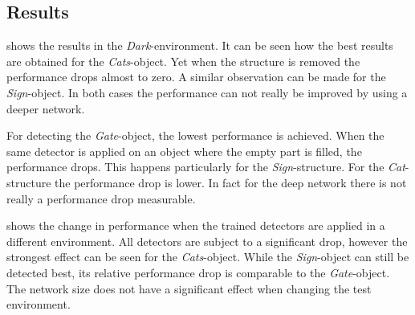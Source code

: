 \subsection{Results}

\begin{table}[hbtp]
	\centering
	
	\caption{Performance of two architectures when the test environment is similar to the training environment. Each trained network (row) is evaluated on each test set (column). It can be seen how the detectors exploit the structure that is placed in the object. In contrary, the detector of \acp{EWFO} only gets confused when the structure inside the object is very different from the training set.}
	\label{tab:all_basement}
\end{table}

 shows the results in the \textit{Dark}-environment. It can be seen how the best results are obtained for the \textit{Cats}-object. Yet when the structure is removed the performance drops almost to zero. A similar observation can be made for the \textit{Sign}-object. In both cases the performance can not really be improved by using a deeper network.

For detecting the \textit{Gate}-object, the lowest performance is achieved. When the same detector is applied on an object where the empty part is filled, the performance drops. This happens particularly for the \textit{Sign}-structure. For the \textit{Cat}-structure the performance drop is lower. In fact for the deep network there is not really a performance drop measurable.

\begin{table}[hbtp]
	\centering
	
	\caption{Change in performance when the detectors are tested in another environment than their training environment. The most severe drop can be seen at the \textit{Cats}-object. The drop for \acp{EWFO} is comparable to the \textit{Sign}-object}
	\label{tab:diff_iros}
\end{table}

 shows the change in performance when the trained detectors are applied in a different environment. All detectors are subject to a significant drop, however the strongest effect can be seen for the \textit{Cats}-object. While the \textit{Sign}-object can still be detected best, its relative performance drop is comparable to the \textit{Gate}-object. The network size does not have a significant effect when changing the test environment.


